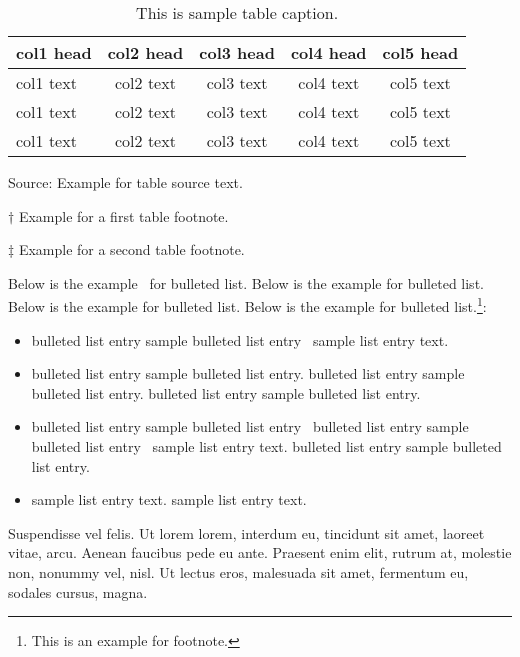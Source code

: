 \documentclass[proof]{WileyASNA-v1}
\begin{document}
\begin{center}
\begin{table}[t]%
\centering
\caption{This is sample table caption.\label{tab2}}%
\tabcolsep=0pt%
\begin{tabular*}{20pc}{@{\extracolsep\fill}lcccc@{\extracolsep\fill}}
\toprule
\textbf{col1 head} & \textbf{col2 head}  & \textbf{col3 head}  & \textbf{col4 head}  & \textbf{col5 head} \\
\midrule
col1 text & col2 text  & col3 text  & col4 text  & col5 text\tnote{$\dagger$}   \\
col1 text & col2 text  & col3 text  & col4 text  & col5 text   \\
col1 text & col2 text  & col3 text  & col4 text  & col5 text\tnote{$\ddagger$}   \\
\bottomrule
\end{tabular*}
\begin{tablenotes}
\item Source: Example for table source text.
\item[$\dagger$] Example for a first table footnote.
\item[$\ddagger$] Example for a second table footnote.
\end{tablenotes}
\end{table}
\end{center}


Below is the example~\cite{Paivio1975} for bulleted list. Below is the example for bulleted list. Below is the example for bulleted list. Below is the example for bulleted list.\footnote{This is an example for footnote.}:
\begin{itemize}
\item bulleted list entry sample bulleted list entry~\cite{Strunk1979} sample list entry text. 
\item bulleted list entry sample bulleted list entry. bulleted list entry sample bulleted list entry. bulleted list entry sample bulleted list entry.
\item bulleted list entry sample bulleted list entry~\cite{Paivio1975} bulleted list entry sample bulleted list entry~\citet{Rutten2007} sample list entry text.  bulleted list entry sample bulleted list entry.
\item sample list entry text. sample list entry text.  
\end{itemize}

Suspendisse vel felis. Ut lorem lorem, interdum eu, tincidunt sit amet, laoreet vitae, arcu. Aenean faucibus pede eu
ante. Praesent enim elit, rutrum at, molestie non, nonummy vel, nisl. Ut lectus eros, malesuada sit amet, fermentum
eu, sodales cursus, magna. 
\end{document}
